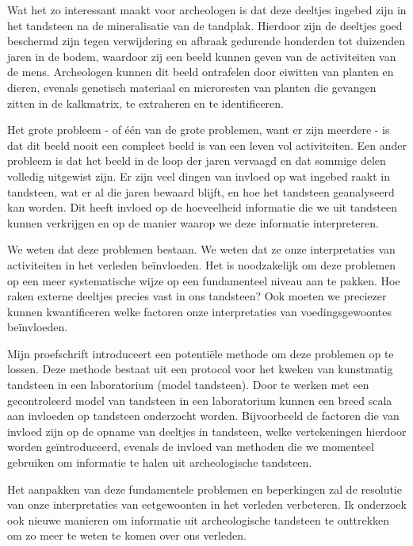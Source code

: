 \documentclass[
  b5paper,
]{book}
\begin{document}
Wat het zo interessant maakt voor archeologen is dat deze deeltjes
ingebed zijn in het tandsteen na de mineralisatie van de tandplak.
Hierdoor zijn de deeltjes goed beschermd zijn tegen verwijdering en
afbraak gedurende honderden tot duizenden jaren in de bodem, waardoor
zij een beeld kunnen geven van de activiteiten van de mens. Archeologen
kunnen dit beeld ontrafelen door eiwitten van planten en dieren, evenals
genetisch materiaal en microresten van planten die gevangen zitten in de
kalkmatrix, te extraheren en te identificeren.

Het grote probleem - of één van de grote problemen, want er zijn
meerdere - is dat dit beeld nooit een compleet beeld is van een leven
vol activiteiten. Een ander probleem is dat het beeld in de loop der
jaren vervaagd en dat sommige delen volledig uitgewist zijn. Er zijn
veel dingen van invloed op wat ingebed raakt in tandsteen, wat er al die
jaren bewaard blijft, en hoe het tandsteen geanalyseerd kan worden. Dit
heeft invloed op de hoeveelheid informatie die we uit tandsteen kunnen
verkrijgen en op de manier waarop we deze informatie interpreteren.

We weten dat deze problemen bestaan. We weten dat ze onze interpretaties
van activiteiten in het verleden beïnvloeden. Het is noodzakelijk om
deze problemen op een meer systematische wijze op een fundamenteel
niveau aan te pakken. Hoe raken externe deeltjes precies vast in ons
tandsteen? Ook moeten we preciezer kunnen kwantificeren welke factoren
onze interpretaties van voedingsgewoontes beïnvloeden.

Mijn proefschrift introduceert een potentiële methode om deze problemen
op te lossen. Deze methode bestaat uit een protocol voor het kweken van
kunstmatig tandsteen in een laboratorium (model tandsteen). Door te
werken met een gecontroleerd model van tandsteen in een laboratorium
kunnen een breed scala aan invloeden op tandsteen onderzocht worden.
Bijvoorbeeld de factoren die van invloed zijn op de opname van deeltjes
in tandsteen, welke vertekeningen hierdoor worden geïntroduceerd,
evenals de invloed van methoden die we momenteel gebruiken om informatie
te halen uit archeologische tandsteen.

Het aanpakken van deze fundamentele problemen en beperkingen zal de
resolutie van onze interpretaties van eetgewoonten in het verleden
verbeteren. Ik onderzoek ook nieuwe manieren om informatie uit
archeologische tandsteen te onttrekken om zo meer te weten te komen over
ons verleden.
\end{document}
